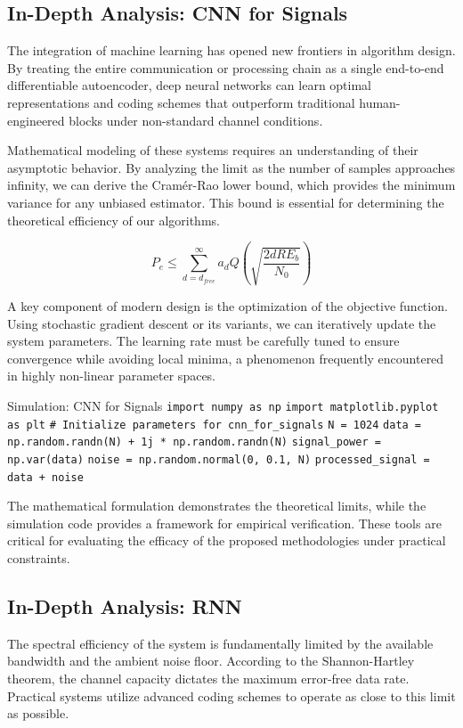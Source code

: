 \subsection{In-Depth Analysis: CNN for Signals}
The integration of machine learning has opened new frontiers in algorithm design. By treating the entire communication or processing chain as a single end-to-end differentiable autoencoder, deep neural networks can learn optimal representations and coding schemes that outperform traditional human-engineered blocks under non-standard channel conditions.

Mathematical modeling of these systems requires an understanding of their asymptotic behavior. By analyzing the limit as the number of samples approaches infinity, we can derive the Cramér-Rao lower bound, which provides the minimum variance for any unbiased estimator. This bound is essential for determining the theoretical efficiency of our algorithms.

\begin{equation}
    P_e \leq \sum_{d=d_{free}}^{\infty} a_d Q\left(\sqrt{\frac{2 d R E_b}{N_0}}\right)
\end{equation}

A key component of modern design is the optimization of the objective function. Using stochastic gradient descent or its variants, we can iteratively update the system parameters. The learning rate must be carefully tuned to ensure convergence while avoiding local minima, a phenomenon frequently encountered in highly non-linear parameter spaces.

\begin{pythonbox}{Simulation: CNN for Signals}
\texttt{import numpy as np}
\texttt{import matplotlib.pyplot as plt}
\texttt{}
\texttt{\# Initialize parameters for cnn\_for\_signals}
\texttt{N = 1024}
\texttt{data = np.random.randn(N) + 1j * np.random.randn(N)}
\texttt{signal\_power = np.var(data)}
\texttt{noise = np.random.normal(0, 0.1, N)}
\texttt{processed\_signal = data + noise}
\end{pythonbox}

\vspace{0.5cm}
The mathematical formulation demonstrates the theoretical limits, while the simulation code provides a framework for empirical verification. These tools are critical for evaluating the efficacy of the proposed methodologies under practical constraints.


\subsection{In-Depth Analysis: RNN}
The spectral efficiency of the system is fundamentally limited by the available bandwidth and the ambient noise floor. According to the Shannon-Hartley theorem, the channel capacity dictates the maximum error-free data rate. Practical systems utilize advanced coding schemes to operate as close to this limit as possible.


